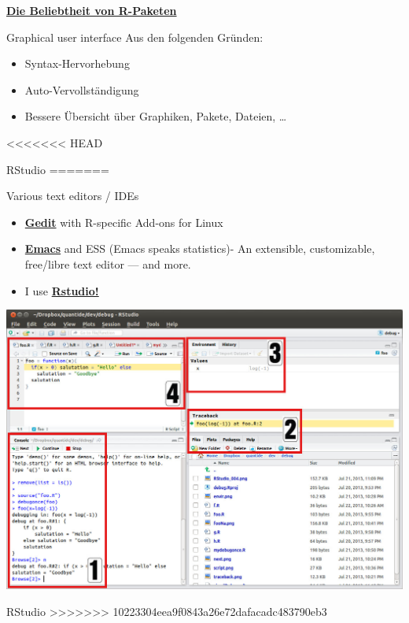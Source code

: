 \documentclass[ignorenonframetext,]{beamer}
\providecommand{\tightlist}{%
  \setlength{\itemsep}{0pt}\setlength{\parskip}{0pt}}
\begin{document}
\begin{frame}{\href{https://gallery.shinyapps.io/cran-gauge/}{\textbf{Die
Beliebtheit von R-Paketen}}}
\begin{frame}{Graphical user interface}
Aus den folgenden Gründen:

\begin{itemize}
\tightlist
\item
  Syntax-Hervorhebung
\item
  Auto-Vervollständigung
\item
  Bessere Übersicht über Graphiken, Pakete, Dateien, \ldots{}
\end{itemize}

\end{frame}

<<<<<<< HEAD
\begin{frame}{RStudio}
=======
\begin{frame}{Various text editors / IDEs}
\protect\hypertarget{various-text-editors-ides}{}

\begin{itemize}
\item
  \href{https://projects.gnome.org/gedit/}{\textbf{Gedit}} with
  R-specific Add-ons for Linux
\item
  \href{http://www.gnu.org/software/emacs/}{\textbf{Emacs}} and ESS
  (Emacs speaks statistics)- An extensible, customizable, free/libre
  text editor --- and more.
\item
  I use \href{https://www.rstudio.com/}{\textbf{Rstudio!}}
\end{itemize}

\includegraphics{figure/0_overall.jpg}

\end{frame}

\begin{frame}{RStudio}
\protect\hypertarget{rstudio}{}
>>>>>>> 10223304eea9f0843a26e72dafacadc483790eb3


\end{frame}
\end{frame}
\end{frame}
\end{document}
